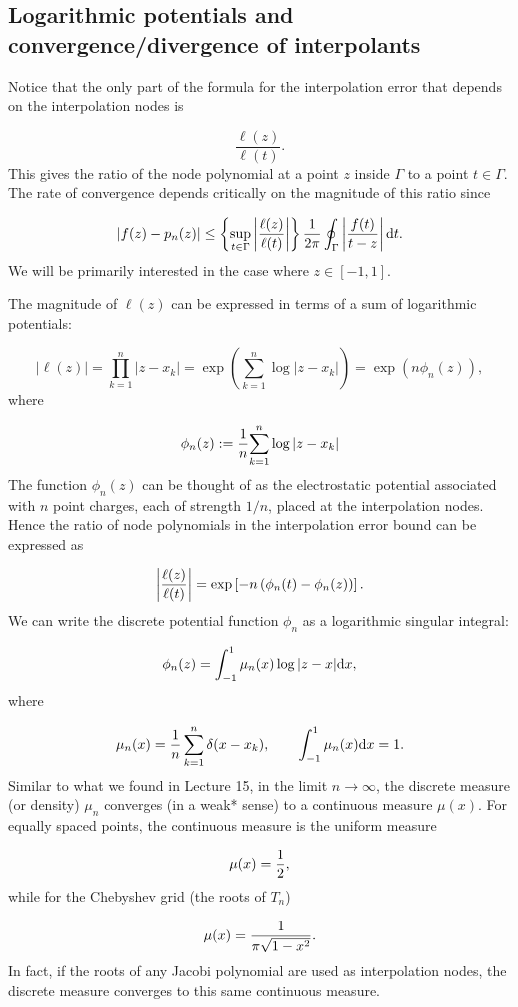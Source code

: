 \documentclass[12pt,a4paper]{article}
\def\D{ {\rm d} }
\def\dx{\D x}
\def\dt{\D t}
\begin{document}
\subsection{Logarithmic potentials and convergence/divergence of interpolants}
Notice that the only part of the formula for the interpolation error that depends on the interpolation nodes is

\[
\frac{\ell(z)}{\ell(t)}.
\]
This gives the ratio of the node polynomial at a point $z$ inside $\Gamma$ to a point $t \in \Gamma$. The rate of convergence depends critically on the magnitude of this ratio since

\[
\vert f(z) - p_n(z) \vert \leq  \left\lbrace\sup_{t \in \Gamma} \left\vert {\ell(z)\over\ell(t)} \right\vert\right\rbrace {1 \over 2\pi}  \oint_{\Gamma} \left\vert{f(t)\over t-z} \right\vert \dt.
\]
We will be primarily interested in the case where $z \in [-1, 1]$.

The magnitude of $\ell(z)$ can be expressed in terms of a sum of logarithmic potentials:

\[
\vert \ell(z) \vert = \prod_{k = 1}^{n} \vert z - x_k \vert = \exp\left({\sum_{k = 1}^n \log \vert z - x_k \vert} \right) = \exp\left( n \phi_n(z) \right),
\]
where

\[
\phi_n(z) := {1\over n}{\sum_{k = 1}^n \log \vert z - x_k \vert}
\]
The function $\phi_n(z)$ can be thought of as the electrostatic potential associated with $n$ point charges, each of strength $1/n$, placed at the interpolation nodes. Hence the ratio of node polynomials in the interpolation error bound can be expressed as

\[
\left\vert {\ell(z)\over\ell(t)} \right\vert =  \exp\left[- n\left(\phi_n(t) - \phi_n(z) \right) \right].
\]
We can write the discrete potential function $\phi_n$ as a logarithmic singular integral:

\[
\phi_n(z) = \int_{-1}^{1} \mu_n(x) \log \vert z - x \vert \dx,
\]
where

\[
\mu_n(x) = {1 \over n}\sum_{k =  1}^n \delta(x - x_k), \qquad  \int_{-1}^{1} \mu_n(x) \dx = 1.
\]
Similar to what we found in Lecture 15, in the limit $n \to \infty$, the discrete measure (or density) $\mu_n$ converges (in a weak* sense) to a continuous measure $\mu(x)$. For equally spaced points, the continuous measure is the uniform measure

\[
\mu(x) = {1\over 2},
\]
while for the Chebyshev grid (the roots of $T_n$)

\[
\mu(x) = {1 \over {\pi \sqrt{1 - x^2}}}.
\]
In fact, if the roots of any Jacobi polynomial are used as interpolation nodes, the discrete measure converges to this same continuous measure.
\end{document}
